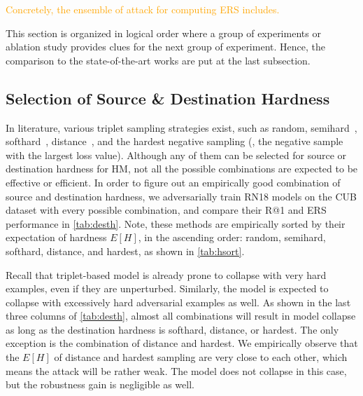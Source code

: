 \documentclass[10pt,twocolumn,letterpaper]{article}
\newcommand{\oo}[1]{\textcolor{orange}{#1}}
\begin{document}
\oo{Concretely, the ensemble of attack for computing ERS includes.}

This section is organized in logical order where a group of experiments
or ablation study
provides clues for the next group of experiment.
%
Hence, the comparison to the state-of-the-art works are put at the last
subsection.

\subsection{Selection of Source \& Destination Hardness}
\label{sec:41}







In literature, various triplet sampling strategies exist, such as random,
semihard~\cite{facenet}, softhard~\cite{revisiting}, distance~\cite{distance},
and the hardest negative sampling (\ie, the negative sample with the largest
loss value).
%
Although any of them can be selected for source or destination hardness for HM,
not all the possible combinations are expected to be effective or efficient.
%
In order to figure out an empirically good combination of source and
destination hardness, we adversarially train RN18 models on the CUB dataset
with every possible combination, and compare their R@1 and ERS performance in
\cref{tab:desth}.
%
Note, these methods are empirically sorted by their expectation of hardness
$E[H]$, in the ascending order: random, semihard, softhard, distance, and
hardest, as shown in \cref{tab:hsort}.


Recall that triplet-based model is already prone to collapse with very hard
examples, even if they are unperturbed.
%
Similarly, the model is expected to collapse with excessively hard adversarial
examples as well.
%
As shown in the last three columns of \cref{tab:desth}, almost all combinations
will result in model collapse as long as the destination hardness is softhard,
distance, or hardest.
%
The only exception is the combination of distance and hardest.
%
We empirically observe that the $E[H]$ of distance and hardest sampling are
very close to each other, which means the attack will be rather weak.
%
The model does not collapse in this case, but the robustness gain is negligible
as well.

\end{document}
